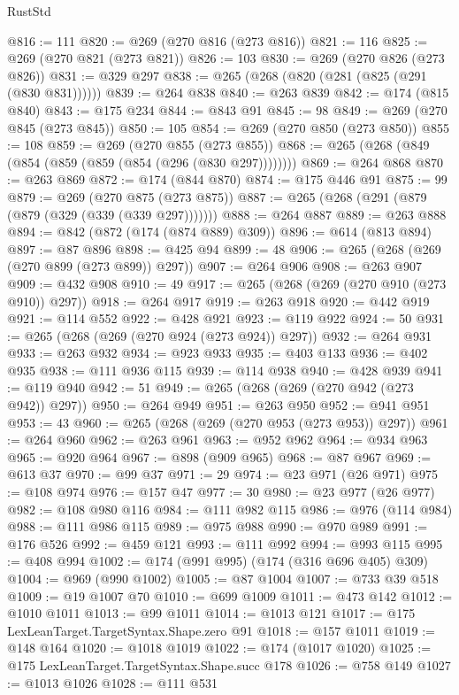 \begin{lexlean}{RustStd}
\begin{coremodule}
{\begin{coremodule}
{{{{{{{{{{{{{{{{{{{{{{{{{{{{{{{{{{{{{{{{{{{{{{{{{{{{{{{{{{{{{{{{{{{{{{{{{{{{{{@816 := 111
@820 := @269 (@270 @816 (@273 @816))
@821 := 116
@825 := @269 (@270 @821 (@273 @821))
@826 := 103
@830 := @269 (@270 @826 (@273 @826))
@831 := @329 @297
@838 := @265 (@268 (@820 (@281 (@825 (@291 (@830 @831))))))
@839 := @264 @838
@840 := @263 @839
@842 := @174 (@815 @840)
@843 := @175 @234
@844 := @843 @91
@845 := 98
@849 := @269 (@270 @845 (@273 @845))
@850 := 105
@854 := @269 (@270 @850 (@273 @850))
@855 := 108
@859 := @269 (@270 @855 (@273 @855))
@868 := @265 (@268 (@849 (@854 (@859 (@859 (@854 (@296 (@830 @297))))))))
@869 := @264 @868
@870 := @263 @869
@872 := @174 (@844 @870)
@874 := @175 @446 @91
@875 := 99
@879 := @269 (@270 @875 (@273 @875))
@887 := @265 (@268 (@291 (@879 (@879 (@329 (@339 (@339 @297)))))))
@888 := @264 @887
@889 := @263 @888
@894 := @842 (@872 (@174 (@874 @889) @309))
@896 := @614 (@813 @894)
@897 := @87 @896
@898 := @425 @94
@899 := 48
@906 := @265 (@268 (@269 (@270 @899 (@273 @899)) @297))
@907 := @264 @906
@908 := @263 @907
@909 := @432 @908
@910 := 49
@917 := @265 (@268 (@269 (@270 @910 (@273 @910)) @297))
@918 := @264 @917
@919 := @263 @918
@920 := @442 @919
@921 := @114 @552
@922 := @428 @921
@923 := @119 @922
@924 := 50
@931 := @265 (@268 (@269 (@270 @924 (@273 @924)) @297))
@932 := @264 @931
@933 := @263 @932
@934 := @923 @933
@935 := @403 @133
@936 := @402 @935
@938 := @111 @936 @115
@939 := @114 @938
@940 := @428 @939
@941 := @119 @940
@942 := 51
@949 := @265 (@268 (@269 (@270 @942 (@273 @942)) @297))
@950 := @264 @949
@951 := @263 @950
@952 := @941 @951
@953 := 43
@960 := @265 (@268 (@269 (@270 @953 (@273 @953)) @297))
@961 := @264 @960
@962 := @263 @961
@963 := @952 @962
@964 := @934 @963
@965 := @920 @964
@967 := @898 (@909 @965)
@968 := @87 @967
@969 := @613 @37
@970 := @99 @37
@971 := 29
@974 := @23 @971 (@26 @971)
@975 := @108 @974
@976 := @157 @47
@977 := 30
@980 := @23 @977 (@26 @977)
@982 := @108 @980 @116
@984 := @111 @982 @115
@986 := @976 (@114 @984)
@988 := @111 @986 @115
@989 := @975 @988
@990 := @970 @989
@991 := @176 @526
@992 := @459 @121
@993 := @111 @992
@994 := @993 @115
@995 := @408 @994
@1002 := @174 (@991 @995) (@174 (@316 @696 @405) @309)
@1004 := @969 (@990 @1002)
@1005 := @87 @1004
@1007 := @733 @39 @518
@1009 := @19 @1007 @70
@1010 := @699 @1009
@1011 := @473 @142
@1012 := @1010 @1011
@1013 := @99 @1011
@1014 := @1013 @121
@1017 := @175 LexLeanTarget.TargetSyntax.Shape.zero @91
@1018 := @157 @1011
@1019 := @148 @164
@1020 := @1018 @1019
@1022 := @174 (@1017 @1020)
@1025 := @175 LexLeanTarget.TargetSyntax.Shape.succ @178
@1026 := @758 @149
@1027 := @1013 @1026
@1028 := @111 @531
}}}}}}}}}}}}}}}}}}}}}}}}}}}}}}}}}}}}}}}}}}}}}}}}}}}}}}}}}}}}}}}}}}}}}}}}}}}}}}
\end{coremodule}}
\end{coremodule}
\end{lexlean}
